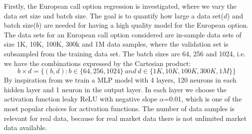 Firstly, the European call option regression is investigated, where we vary the data set size and batch size. The goal is to quantify how large a data set($d$) and batch size($b$) are needed for having a high quality model for the European option. The data sets for an European call option considered are in-sample data sets of size 1K, 10K, 100K, 300k and 1M data samples, where the validation set is subsampled from the training data set. The batch sizes are 64, 256 and 1024, i.e. we have the combinations expressed by the Cartesian product:
$$b \times d = \{(b, d) : b \in \{64, 256, 1024\} \ and \ d \in\{1K,10K,100K,300K,1M \} \}$$
By inspiration from \parencite{HirsaAli2019} we train a MLP model with 4 layers, 120 neurons in each hidden layer and 1 neuron in the output layer. In each layer we choose the activation function leaky ReLU with negative slope $\alpha$=0.01, which is one of the most popular choices for activation functions. The number of data samples is relevant for real data, because for real market data there is not unlimited market data available.\\

